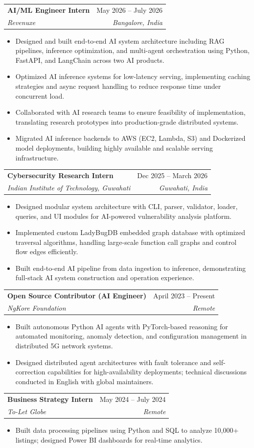 \documentclass[letterpaper,11pt]{article}
\makeatletter
\newcommand{\resumeItem}[1]{
  \item\small{
    {#1 \vspace{-2pt}}
  }
}
\newcommand{\resumeSubheading}[4]{
  \vspace{-2pt}\item
    \begin{tabular*}{0.97\textwidth}[t]{l@{\extracolsep{\fill}}r}
      \textbf{#1} & #2 \\
      \textit{\small#3} & \textit{\small #4} \\
    \end{tabular*}\vspace{-7pt}
}
\newcommand{\resumeItemListStart}{\begin{itemize}}
\newcommand{\resumeItemListEnd}{\end{itemize}\vspace{-5pt}}
\makeatother
\begin{document}
    \resumeSubheading
      {AI/ML Engineer Intern}{May 2026 -- July 2026}
      {Revenuxe}{Bangalore, India}
      \resumeItemListStart
        \resumeItem{Designed and built end-to-end AI system architecture including RAG pipelines, inference optimization, and multi-agent orchestration using Python, FastAPI, and LangChain across two AI products.}
        \resumeItem{Optimized AI inference systems for low-latency serving, implementing caching strategies and async request handling to reduce response time under concurrent load.}
        \resumeItem{Collaborated with AI research teams to ensure feasibility of implementation, translating research prototypes into production-grade distributed systems.}
        \resumeItem{Migrated AI inference backends to AWS (EC2, Lambda, S3) and Dockerized model deployments, building highly available and scalable serving infrastructure.}
      \resumeItemListEnd

    \resumeSubheading
      {Cybersecurity Research Intern}{Dec 2025 -- March 2026}
      {Indian Institute of Technology, Guwahati}{Guwahati, India}
      \resumeItemListStart
        \resumeItem{Designed modular system architecture with CLI, parser, validator, loader, queries, and UI modules for AI-powered vulnerability analysis platform.}
        \resumeItem{Implemented custom LadyBugDB embedded graph database with optimized traversal algorithms, handling large-scale function call graphs and control flow edges efficiently.}
        \resumeItem{Built end-to-end AI pipeline from data ingestion to inference, demonstrating full-stack AI system construction and operation experience.}
      \resumeItemListEnd

    \resumeSubheading
      {Open Source Contributor (AI Engineer)}{April 2023 -- Present}
      {NgKore Foundation}{Remote}
      \resumeItemListStart
        \resumeItem{Built autonomous Python AI agents with PyTorch-based reasoning for automated monitoring, anomaly detection, and configuration management in distributed 5G network systems.}
        \resumeItem{Designed distributed agent architectures with fault tolerance and self-correction capabilities for high-availability deployments; technical discussions conducted in English with global maintainers.}
      \resumeItemListEnd

    \resumeSubheading
      {Business Strategy Intern}{May 2024 -- July 2024}
      {To-Let Globe}{Remote}
      \resumeItemListStart
        \resumeItem{Built data processing pipelines using Python and SQL to analyze 10,000+ listings; designed Power BI dashboards for real-time analytics.}
      \resumeItemListEnd
\end{document}
